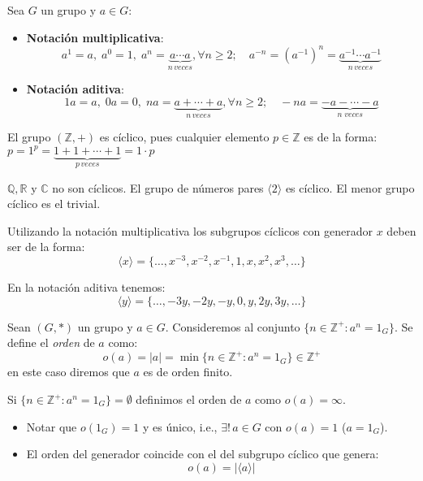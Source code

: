 	Sea $G$ un grupo y $a \in G$:
	\begin{itemize}
		\item \textbf{Notación multiplicativa}:
		\[ a^1 = a, \; a^0 = 1, \; a^n = \underbrace{a \cdots a}_{n \, veces}, \forall n \ge 2; \quad a^{-n} = (a^{-1})^n = \underbrace{a^{-1} \cdots a^{-1}}_{n \, veces}\] \vspace{-5mm}
		
		\item \textbf{Notación aditiva}:
		\[ 1a = a, \; 0a = 0, \; na = \underbrace{a + \cdots + a}_{n \, veces}, \forall n \ge 2; \quad -na = \underbrace{-a - \cdots -a}_{n \; veces}\]
	\end{itemize}
	
	\begin{fmd-example}
		El grupo $(\mathbb{Z}, +)$ es cíclico, pues cualquier elemento $p \in \mathbb{Z}$ es de la forma: $p = 1^p = \underbrace{1+1+\cdots+1}_{p \, veces} = 1 \cdot p$
	\end{fmd-example}
	
	$\mathbb{Q}, \mathbb{R}$ y $\mathbb{C}$ no son cíclicos. El grupo de números pares $\langle 2 \rangle$ es cíclico. El menor grupo cíclico es el trivial.
	
	Utilizando la notación multiplicativa los subgrupos cíclicos con generador $x$ deben ser de la forma:
	\[ \langle x \rangle = \{ \dots, x^{-3}, x^{-2}, x^{-1}, 1, x, x^2, x^3,  \dots \} \]
	
	En la notación aditiva tenemos:
	\[ \langle y \rangle = \{ \dots, -3y, -2y, -y, 0, y, 2y, 3y,  \dots \} \]


	\begin{fmd-definition}
		Sean $(G, *)$ un grupo y $a \in G$. Consideremos al conjunto $\{ n \in \mathbb{Z}^{+}: a^n = 1_G \}$. Se define el \textit{orden} de $a$ como:
		\[ o(a) = |a| = \min \{ n \in \mathbb{Z}^{+}: a^n = 1_G\} \in \mathbb{Z}^{+} \]
		en este caso diremos que $a$ es de orden finito.
		
		Si $\{ n \in \mathbb{Z}^{+}: a^n = 1_G\} = \emptyset$ definimos el orden de $a$ como $o(a) = \infty$.
	\end{fmd-definition}
	\begin{itemize}
		\item Notar que $o(1_G) = 1$ y es único, i.e., $\exists! \, a \in G$ con $o(a) = 1$ ($a = 1_G$).
		\item El orden del generador coincide con el del subgrupo cíclico que genera:
		\[ o(a) = |\langle a \rangle| \]
	\end{itemize}
	
